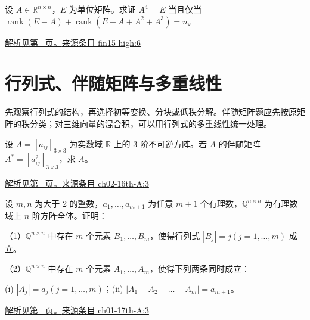 \documentclass[UTF8,12pt,a4paper,fontset=fandol]{ctexart}
\begin{document}
\begin{example}\label{ex:fin15-high:6}

设 $A \in \mathbb{R}^{n\times n}$，$E$ 为单位矩阵。求证 $A^{4} = E$ 当且仅当 $\operatorname{rank}(E - A) + \operatorname{rank}\left(E + A + A^{2} + A^{3}\right) = n$。

\par\hyperref[ans:fin15-high:6]{解析见第~\pageref{ans:fin15-high:6} 页。}\quad\href{https://github.com/lzxcr/cmc-mathematics/blob/64916fa1fdbc3e444a652eca204d5669058ee321/src/problems/finals/15/06.md}{来源条目 fin15-high:6}

\end{example}

\section{行列式、伴随矩阵与多重线性}

\label{sec:questions-2}

先观察行列式的结构，再选择初等变换、分块或低秩分解。伴随矩阵题应先按原矩阵的秩分类；对三维向量的混合积，可以用行列式的多重线性统一处理。

\begin{example}\label{ex:ch02-16th-A:3}

设 $A=[a_{ij}]_{3 \times 3}$ 为实数域 $\mathbb{R}$ 上的 3 阶不可逆方阵。若 $A$ 的伴随矩阵 $A^{*}=[a_{ij}^{2}]_{3 \times 3}$，求 $A$。

\par\hyperref[ans:ch02-16th-A:3]{解析见第~\pageref{ans:ch02-16th-A:3} 页。}\quad\href{https://github.com/lzxcr/cmc-mathematics/blob/64916fa1fdbc3e444a652eca204d5669058ee321/src/problems/preliminary/16/03.md}{来源条目 ch02-16th-A:3}

\end{example}

\begin{example}\label{ex:ch01-17th-A:3}

设 $m, n$ 为大于 2 的整数，$a_1, \dots, a_{m+1}$ 为任意 $m+1$ 个有理数，$\mathbb Q^{n\times n}$ 为有理数域上 $n$ 阶方阵全体。证明：

（1）$\mathbb Q^{n\times n}$ 中存在 $m$ 个元素 $B_1, \dots, B_m$，使得行列式 $\left|B_j\right| = j(j=1, \dots, m)$ 成立。

（2）$\mathbb Q^{n\times n}$ 中存在 $m$ 个元素 $A_1, \dots, A_m$，使得下列两条同时成立：

(i) $\left|A_j\right| = a_j(j=1, \dots, m)$；(ii) $\left|A_1 - A_2 - \dots - A_m\right| = a_{m+1}$。

\par\hyperref[ans:ch01-17th-A:3]{解析见第~\pageref{ans:ch01-17th-A:3} 页。}\quad\href{https://github.com/lzxcr/cmc-mathematics/blob/64916fa1fdbc3e444a652eca204d5669058ee321/src/problems/preliminary/17/03.md}{来源条目 ch01-17th-A:3}

\end{example}
\end{document}

